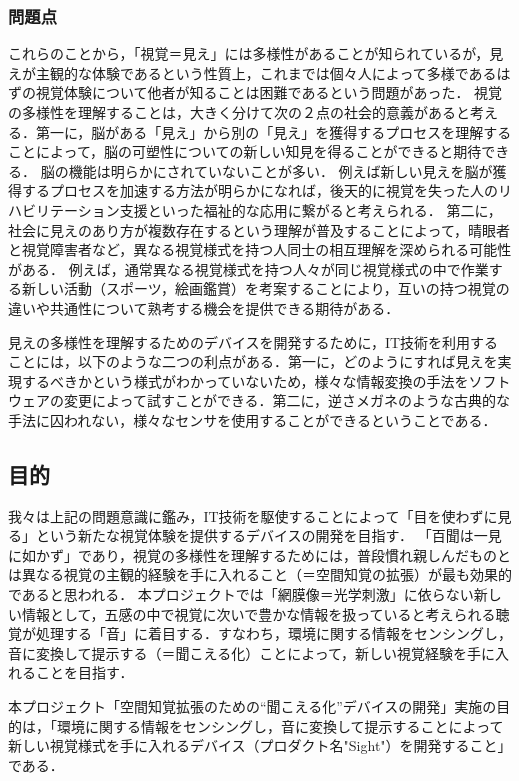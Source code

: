 \subsubsection{問題点}
これらのことから，「視覚＝見え」には多様性があることが知られているが，見えが主観的な体験であるという性質上，これまでは個々人によって多様であるはずの視覚体験について他者が知ることは困難であるという問題があった．
視覚の多様性を理解することは，大きく分けて次の２点の社会的意義があると考える．第一に，脳がある「見え」から別の「見え」を獲得するプロセスを理解することによって，脳の可塑性についての新しい知見を得ることができると期待できる．
脳の機能は明らかにされていないことが多い．
例えば新しい見えを脳が獲得するプロセスを加速する方法が明らかになれば，後天的に視覚を失った人のリハビリテーション支援といった福祉的な応用に繋がると考えられる．
第二に，社会に見えのあり方が複数存在するという理解が普及することによって，晴眼者と視覚障害者など，異なる視覚様式を持つ人同士の相互理解を深められる可能性がある．
例えば，通常異なる視覚様式を持つ人々が同じ視覚様式の中で作業する新しい活動（スポーツ，絵画鑑賞）を考案することにより，互いの持つ視覚の違いや共通性について熟考する機会を提供できる期待がある．

見えの多様性を理解するためのデバイスを開発するために，IT技術を利用することには，以下のような二つの利点がある．第一に，どのようにすれば見えを実現するべきかという様式がわかっていないため，様々な情報変換の手法をソフトウェアの変更によって試すことができる．第二に，逆さメガネのような古典的な手法に囚われない，様々なセンサを使用することができるということである．

\subsection{目的}
我々は上記の問題意識に鑑み，IT技術を駆使することによって「目を使わずに見る」という新たな視覚体験を提供するデバイスの開発を目指す．
「百聞は一見に如かず」であり，視覚の多様性を理解するためには，普段慣れ親しんだものとは異なる視覚の主観的経験を手に入れること（＝空間知覚の拡張）が最も効果的であると思われる．
本プロジェクトでは「網膜像＝光学刺激」に依らない新しい情報として，五感の中で視覚に次いで豊かな情報を扱っていると考えられる聴覚が処理する「音」に着目する．すなわち，環境に関する情報をセンシングし，音に変換して提示する（＝聞こえる化）ことによって，新しい視覚経験を手に入れることを目指す．

本プロジェクト「空間知覚拡張のための``聞こえる化''デバイスの開発」実施の目的は，「環境に関する情報をセンシングし，音に変換して提示することによって新しい視覚様式を手に入れるデバイス（プロダクト名"Sight"）を開発すること」である．












